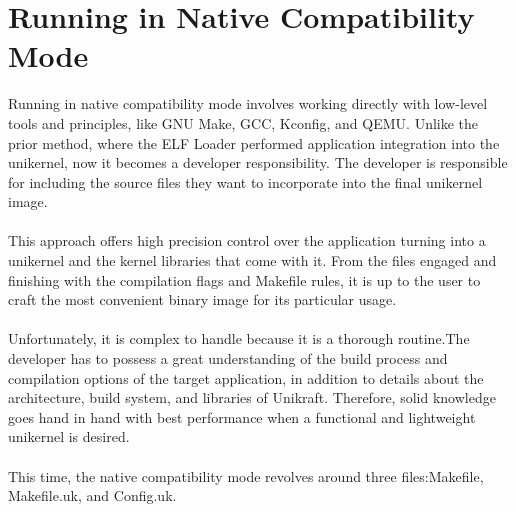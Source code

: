\section{Running in Native Compatibility Mode}
Running in native compatibility mode involves working directly with low-level tools and principles, like GNU Make, GCC\cite{gcc-gnu}, Kconfig, and QEMU.
Unlike the prior method, where the ELF Loader performed application integration into the unikernel, now it becomes a developer responsibility. The developer is responsible for including the source files they want to incorporate into the final unikernel image. \\ \\
This approach offers high precision control over the application turning into a unikernel and the kernel libraries that come with it.\@
From the files engaged and finishing with the compilation flags and Makefile rules, it is up to the user to craft the most convenient binary image for its particular usage. \\ \\
Unfortunately, it is complex to handle because it is a thorough routine.\@ The developer has to possess a great understanding of the build process and compilation options of the target application, in addition to details about the architecture, build system, and libraries of Unikraft.\@
Therefore, solid knowledge goes hand in hand with best performance when a functional and lightweight unikernel is desired. \\ \\ 
This time, the native compatibility mode revolves around three files:\@ Makefile, Makefile.uk, and Config.uk.
